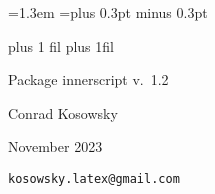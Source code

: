 \def\packageversion{1.2}
\def\packagedate{November 2023}

\MacroIndent=1.3em
\def\scalemu#1#2{\muexpr#2#1
  \@plus\muexpr#2\gluetomu\gluestretch\mutoglue#1\relax
  \@minus\muexpr#2\gluetomu\glueshrink\mutoglue#1\relax\relax}
\baselineskip=\the\baselineskip plus 0.3pt minus 0.3pt\relax

\let\@@section\section
\def\section{\@ifstar\star@sect\no@star@sect}
\def\star@sect#1{\sectionhook{#1}\@@section*{#1}}
\def\no@star@sect#1{\sectionhook{#1}\@@section{#1}}

\def\sectionhook#1{%
  \ifdim\dimexpr\pagegoal-\pagetotal-3pt\relax<6\bigskipamount
    \vfill\eject
  \fi
  \def\sectionname{#1}}

\def\@oddhead{%
  \ifnum\count0>1\relax
    \ifodd\c@page
      \rlap{\textit{\sectionname}}\hfil
      \hbox to 0pt{\hss\documentname\hss}\hfil
      \llap{\the\count0}%
    \else
      \rlap{\the\count0}\hfil
      \hbox to 0pt{\hss\documentname\hss}\hfil
      \llap{\textit{\sectionname}}%
    \fi
  \fi}
\def\@oddfoot{\hfil\ifnum\count0=1\relax1\fi\hfil}


\let\code\@undefined
\let\endcode\@undefined
\newenvironment{code}
 {\strut\vadjust\bgroup\medskip\parindent\z@\leftskip=4em\relax
   \noindent\strut\ignorespaces}
 {\strut\par\medskip\egroup\hfill\break\strut\ignorespacesafterend}
\def\argtext#1{\ensuremath{\langle$\textit{#1}$\rangle}}
\def\vrb#1{\expandafter\texttt\expandafter{\string#1}}
\def\clap@math#1{\hb@xt@\z@{\hss$\displaystyle#1$\hss}}

{\large
\parindent=0pt
\leftskip=0pt plus 1 fil
\rightskip=0pt plus 1fil
\parfillskip=0pt
{\strut\Large Package \textsf{innerscript} v.\ 1.2 \documentname}\par
\strut Conrad Kosowsky\par
\strut \packagedate\par
\strut\texttt{kosowsky.latex@gmail.com}\par}

